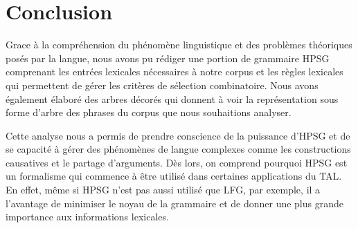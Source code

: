 \section{Conclusion}

Grace à la compréhension du phénomène linguistique et des problèmes théoriques posés par la langue, nous avons
pu rédiger une portion de grammaire HPSG comprenant les entrées lexicales nécessaires à notre corpus et les règles lexicales
qui permettent de gérer les critères de sélection combinatoire. Nous avons également élaboré des arbres décorés qui donnent
à voir la représentation sous forme d'arbre des phrases du corpus que nous souhaitions analyser.

Cette analyse nous a permis de prendre conscience de la puissance d'HPSG et de se capacité à gérer des phénomènes de langue
complexes comme les constructions causatives et le partage d'arguments. Dès lors, on comprend pourquoi HPSG est un formalisme
qui commence à être utilisé dans certaines applications du TAL. En effet, même si HPSG n'est pas aussi utilisé que LFG, par
exemple, il a l'avantage de minimiser le noyau de la grammaire et de donner une plus grande importance aux informations
lexicales.
